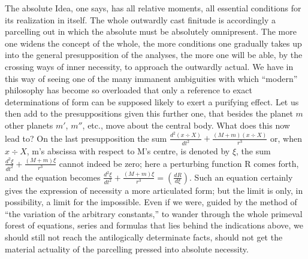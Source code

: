 \documentclass[12pt,a4paper]{book}
\begin{document}
The absolute Idea, one says, has all relative moments, all essential conditions for its realization
in itself. The whole outwardly cast finitude is accordingly a parcelling out in which the absolute
must be absolutely omnipresent. The more one widens the concept of the whole, the more conditions
one gradually takes up into the general presupposition of the analyses, the more one will be able,
by the crossing ways of inner necessity, to approach the outwardly actual. We have in this way of
seeing one of the many immanent ambiguities with which ``modern'' philosophy has become so
overloaded that only a reference to exact determinations of form can be supposed likely to exert a
purifying effect. Let us then add to the presuppositions given this further one, that besides the
planet $m$ other planets $m'$, $m''$, etc., move about the central body. What does this now lead to?
On the last presupposition the sum
$\frac{d^{2}(x \div X)}{dt^{2}} + \frac{(M + m)(x \div X)}{r^{3}}$
or, when $x \div X$, m's abscissa with respect to M's centre, is denoted by $\xi$, the sum
$\frac{d^{2}\xi}{dt^{2}} + \frac{(M + m)\xi}{r^{3}}$ cannot indeed be zero; here a perturbing
function R comes forth, and the equation becomes
$\frac{d^{2}\xi}{dt^{2}} + \frac{(M + m)\xi}{r^{3}} = \left(\frac{dR}{d\xi}\right)$. Such an
equation certainly gives the expression of necessity a more articulated form; but the limit is only,
in possibility, a limit for the impossible. Even if we were, guided by the method of ``the variation
of the arbitrary constants,'' to wander through the whole primeval forest of equations, series and
formulas that lies behind the indications above, we should still not reach the antilogically
determinate facts, should not get the material actuality of the parcelling pressed into absolute
necessity.
\end{document}
